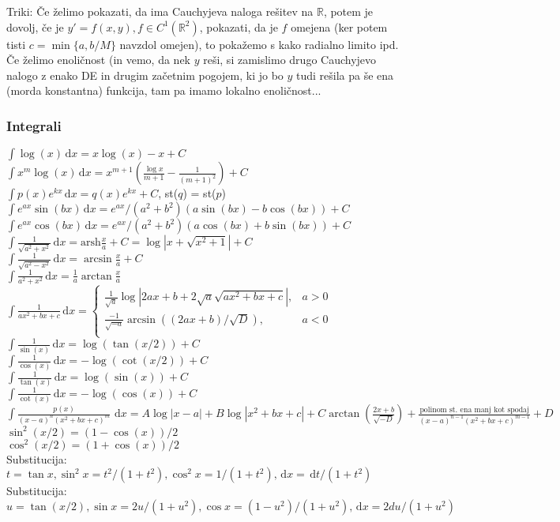 \documentclass[a4paper,10pt]{article}
\theoremstyle{definition}
\def\R{\mathbb{R}}
\newcommand{\dx}{\ensuremath{\,\mathrm{d}x}}
\newcommand{\dt}{\ensuremath{\,\mathrm{d}t}}
\let\oldint\int
\renewcommand{\int}{\oldint \!}
\begin{document}
Triki: Če želimo pokazati, da ima Cauchyjeva naloga rešitev na $\R$, potem je
dovolj, če je $y' = f(x,y), f\in C^1(\R ^2)$, pokazati, da je $f$ omejena (ker
potem tisti $c = \min\{ a, b/M\}$ navzdol omejen), to pokažemo s kako radialno
limito ipd.\\ Če želimo enoličnost (in vemo, da nek $y$ reši, si zamislimo drugo
Cauchyjevo nalogo z enako DE in drugim začetnim pogojem, ki jo bo $y$ tudi
rešila pa še ena (morda konstantna) funkcija, tam pa imamo lokalno enoličnost...

\newpage

\subsubsection*{Integrali}
$\int \log(x) \dx = x \log(x) - x + C$ \\
$\int x^m\log(x) \dx = x^{m+1}\left(\frac{\log x}{m+1} - \frac{1}{(m+1)^2}\right) + C$ \\
$\int p(x) e^{k x} \dx = q(x) e^{k x} + C$, st($q$) = st($p$) \\
$\int e^{a x} \sin(b x) \dx = e^{a x} / (a^2 + b^2) (a \sin(b x) - b \cos(b x)) + C$\\
$\int e^{a x} \cos(b x) \dx = e^{a x} / (a^2 + b^2) (a \cos(b x) + b \sin(b x)) + C$\\
$\int \frac{1}{\sqrt{a^2 + x^2}} \dx = \text{arsh}\frac{x}{a} + C = \log|x + \sqrt{x^2 + 1}| + C$ \\
$\int \frac{1}{\sqrt{a^2 - x^2}} \dx = \arcsin\frac{x}{a} + C$ \\
$\int \frac{1}{a^2+x^2} \dx = \frac{1}{a}\arctan\frac{x}{a}$ \\
$\int \frac{1}{ax^2 + bx + c} \dx =
  \begin{cases}
    \frac{1}{\sqrt{a}}\log|2ax + b + 2 \sqrt{a} \sqrt{ax^2 + bx + c}|, & a > 0 \\
    \frac{-1}{\sqrt{-a}} \arcsin((2ax + b)/\sqrt{D}), & a < 0  \\
  \end{cases}$ \\
$\int \frac{1}{\sin(x)} \dx = \log(\tan(x/2)) + C$ \\
$\int \frac{1}{\cos(x)} \dx = -\log(\cot(x/2)) + C$ \\
$\int \frac{1}{\tan(x)} \dx = \log(\sin(x)) + C$ \\
$\int \frac{1}{\cot(x)} \dx = - \log(\cos(x)) + C$ \\
$\int \frac{p(x)}{(x-a)^n (x^2 + bx + c)^m} \, \dx = A \log|x - a| + B \log|x^2 + bx + c| + C \arctan(\frac{2x + b}{\sqrt{-D}}) + \frac{\text{polinom st. ena manj kot spodaj}}{(x-a)^{n-1} (x^2 + bx + c)^{m-1}} + D$ \\
$\sin^2(x/2) = (1 - \cos(x))/2$ \\
$\cos^2(x/2) = (1 + \cos(x))/2$ \\
Substitucija: $t = \tan x, \sin^2 x = t^2 /(1 + t^2), \cos^2 x = 1/(1 + t^2), \dx = \dt/(1 + t^2)$\\
Substitucija: $u = \tan (x/2), \sin x = 2 u /(1 + u^2), \cos x = (1-u^2)/(1 + u^2), \dx = 2 du/(1 + u^2)$\\
\end{document}

